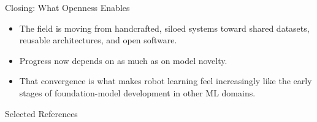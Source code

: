 \documentclass{beamer}
\begin{document}
\begin{frame}{Closing: What Openness Enables}
  \begin{itemize}
    \item The field is moving from handcrafted, siloed systems toward shared datasets, reusable architectures, and open software.
    \item Progress now depends on  as much as on model novelty.
    \item That convergence is what makes robot learning feel increasingly like the early stages of foundation-model development in other ML domains.
  \end{itemize}

  \vspace{0.25cm}
\end{frame}

\begin{frame}[allowframebreaks]{Selected References}
\scriptsize

\end{frame}
\end{document}
